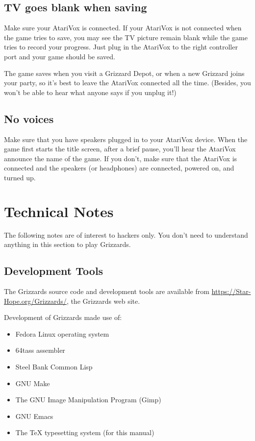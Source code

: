 \documentclass[12pt,twoside,openright,book]{memoir}
\begin{document}
\begin{description}
\section{TV goes blank when saving}

Make sure your AtariVox is connected. If your AtariVox is not
connected when the game tries to save, you may see the TV picture
remain blank while the game tries to record your progress. Just plug
in the AtariVox to the right controller port and your game should be
saved.

The game saves when  you visit a Grizzard Depot, or  when a new Grizzard
joins your party,  so it's best to leave the  AtariVox connected all the
time.  (Besides, you  won't be  able  to hear  what anyone  says if  you
unplug it!)

\section{No voices}

Make sure  that you have  speakers plugged  in to your  AtariVox device.
When the game first starts the title screen, after a brief pause, you'll
hear the AtariVox announce the name of the game. If you don't, make sure
that  the AtariVox  is connected  and the  speakers (or  headphones) are
connected, powered on, and turned up.

\chapter{Technical Notes}

The following notes are of interest to hackers only. You don't need to
understand anything in this section to play Grizzards.

\section{Development Tools}

The  Grizzards source  code  and development  tools  are available  from
\href{https://Star-Hope.org/Grizzards/}{https://Star-Hope.org/Grizzards/},
the Grizzards web site.

Development of Grizzards made use of:

\begin{itemize}
\item Fedora Linux operating system
\item 64tass assembler
\item Steel Bank Common Lisp
\item GNU Make
\item The GNU Image Manipulation Program (Gimp)
\item GNU Emacs
\item The \TeX{} typesetting system (for this manual)
\end{itemize}


\end{description}
\end{document}
